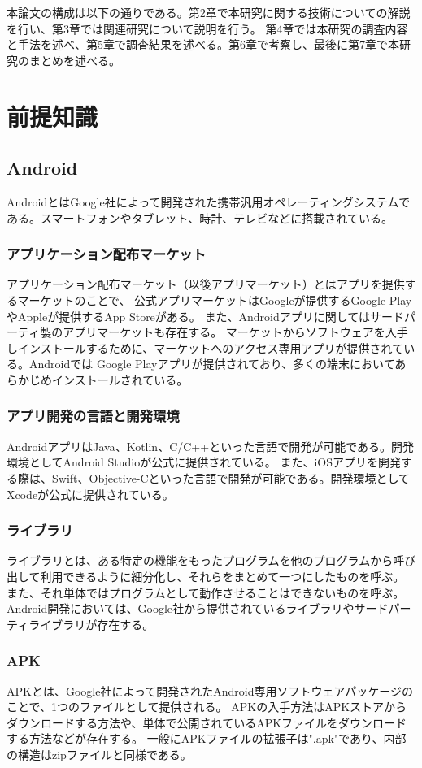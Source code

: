 \documentclass[a4j]{jarticle}
\begin{document}
本論文の構成は以下の通りである。第2章で本研究に関する技術についての解説を行い、第3章では関連研究について説明を行う。
第4章では本研究の調査内容と手法を述べ、第5章で調査結果を述べる。第6章で考察し、最後に第7章で本研究のまとめを述べる。


\newpage
\section{前提知識}
\subsection{Android}
AndroidとはGoogle社によって開発された携帯汎用オペレーティングシステムである。スマートフォンやタブレット、時計、テレビなどに搭載されている。

\subsubsection{アプリケーション配布マーケット}
アプリケーション配布マーケット（以後アプリマーケット）とはアプリを提供するマーケットのことで、
公式アプリマーケットはGoogleが提供するGoogle PlayやAppleが提供するApp Storeがある。
また、Androidアプリに関してはサードパーティ製のアプリマーケットも存在する。
マーケットからソフトウェアを入手しインストールするために、マーケットへのアクセス専用アプリが提供されている。Androidでは
Google Playアプリが提供されており、多くの端末においてあらかじめインストールされている。
\subsubsection{アプリ開発の言語と開発環境}
AndroidアプリはJava、Kotlin、C/C++といった言語で開発が可能である。開発環境としてAndroid Studioが公式に提供されている。
また、iOSアプリを開発する際は、Swift、Objective-Cといった言語で開発が可能である。開発環境としてXcodeが公式に提供されている。
\subsubsection{ライブラリ}
ライブラリとは、ある特定の機能をもったプログラムを他のプログラムから呼び出して利用できるように細分化し、それらをまとめて一つにしたものを呼ぶ。
また、それ単体ではプログラムとして動作させることはできないものを呼ぶ。
Android開発においては、Google社から提供されているライブラリやサードパーティライブラリが存在する。
\subsubsection{APK}
APKとは、Google社によって開発されたAndroid専用ソフトウェアパッケージのことで、1つのファイルとして提供される。
APKの入手方法はAPKストアからダウンロードする方法や、単体で公開されているAPKファイルをダウンロードする方法などが存在する。
一般にAPKファイルの拡張子は".apk"であり、内部の構造はzipファイルと同様である。
\end{document}
